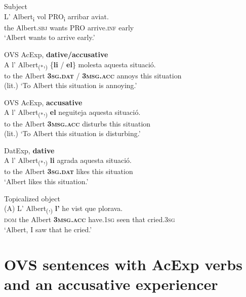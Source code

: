 \documentclass[output=paper,colorlinks,citecolor=brown,modfonts,nonflat]{langsci/langscibook}
\begin{document}
 \ex Subject\label{ex:royo:12d}\\
 \gll L’ Albert\textsubscript{i} vol PRO\textsubscript{i} arribar aviat.\\
 the Albert.\textsc{sbj} wants PRO arrive.\textsc{inf} early\\
\glt ‘Albert wants to arrive early.’

 \z
 \z



\ea%
 \label{ex:royo:13}
 \ea OVS AcExp, \textbf{dative/accusative}\label{ex:royo:13a}\\
 \gll A l’ Albert\textsubscript{(*},\textsubscript{)} \{\textbf{li} / \textbf{el}\} molesta aquesta situació.\\
 to the Albert \textbf{\textsc{3sg.dat}} / \textbf{\textsc{3msg.acc}} annoys this situation\\
\glt (lit.) ‘To Albert this situation is annoying.’

 \ex OVS AcExp, \textbf{accusative}\label{ex:royo:13b}\\
 \gll A l’ Albert\textsubscript{(*},\textsubscript{)} \textbf{el} neguiteja aquesta situació.\\
 to the Albert \textbf{\textsc{3msg.acc}} disturbs this situation \\
\glt (lit.) ‘To Albert this situation is disturbing.’

\newpage
 \ex DatExp, \textbf{dative}\label{ex:royo:13c}\\
 \gll A l’ Albert\textsubscript{(*},\textsubscript{)} \textbf{li} agrada aquesta situació.\\
 to the Albert \textbf{\textsc{3sg.dat}} likes this situation\\
\glt ‘Albert likes this situation.’

 \ex Topicalized object\label{ex:royo:13d}\\
 \gll (A) L’ Albert\textsubscript{(},\textsubscript{)} \textbf{l’} he vist que plorava.\\
\textsc{dom}  the Albert \textbf{\textsc{3msg.acc}} have.\textsc{1sg} seen that cried.\textsc{3sg}\\
\glt ‘Albert, I saw that he cried.’
 \z
 \z


\section{OVS sentences with AcExp verbs and an accusative experiencer}\label{sec:royo:4}
\end{document}

